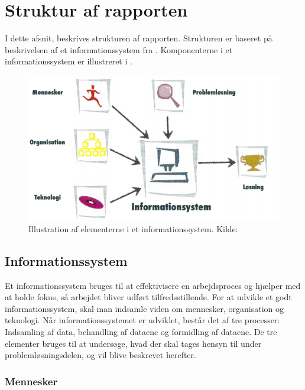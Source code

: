 \chapter{Struktur af rapporten}\label{chap:struktur-af-problemanalyse}

I dette afsnit, beskrives strukturen af rapporten.
Strukturen er baseret på beskrivelsen af et informationssystem fra \citet{Laudon1999}.
Komponenterne i et informationssystem er illustreret i .

\begin{figure}[htbp]
  \centering
  \includegraphics{images/kontekstmodel/metode.png}
  \caption[Metode for Kontekstmodellen]{Illustration af elementerne i et informationssystem. Kilde:
  \protect\citet{Laudon1999}}
  \label{fig:kontekstmodel}
\end{figure}


\section{Informationssystem}\label{sec:Informationssystem}

Et informationssystem bruges til at effektivisere en arbejdsproces og hjælper med at holde fokus, så arbejdet bliver udført tilfredsstillende. 
For at udvikle et godt informationssystem, skal man indsamle viden om mennesker, organisation og teknologi. 
Når informationssystemet er udviklet, består det af tre processer: Indsamling af data, behandling af dataene og formidling af dataene. 
De tre elementer bruges til at undersøge, hvad der skal tages hensyn til under problemløsningsdelen, og vil blive beskrevet herefter.

\subsection{Mennesker}\label{subsec:mennesker}

